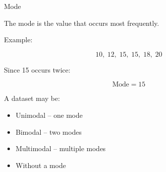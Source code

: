 \documentclass[aspectratio=169]{beamer}
\begin{document}
\begin{frame}{Mode}

The mode is the value that occurs most frequently.

Example:

\[
10,\;12,\;15,\;15,\;18,\;20
\]

Since 15 occurs twice:

\[
\boxed{\text{Mode}=15}
\]

A dataset may be:

\begin{itemize}
    \item Unimodal -- one mode
    \item Bimodal -- two modes
    \item Multimodal -- multiple modes
    \item Without a mode
\end{itemize}
\end{frame}
\end{document}
